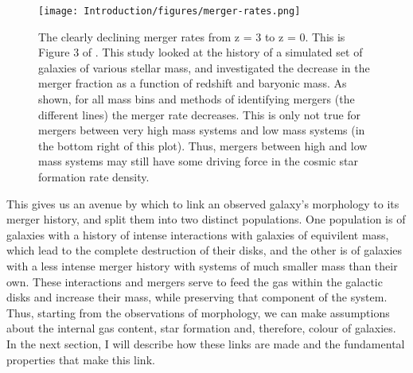 \begin{figure}
    \centering
    \texttt{[image: Introduction/figures/merger-rates.png]}
    \caption{The clearly declining merger rates from z = 3 to z = 0. This is Figure 3 of \citet{2010ApJ...715..202H}. This study looked at the history of a simulated set of galaxies of various stellar mass, and investigated the decrease in the merger fraction as a function of redshift and baryonic mass. As shown, for all mass bins and methods of identifying mergers (the different lines) the merger rate decreases. This is only not true for mergers between very high mass systems and low mass systems (in the bottom right of this plot). Thus, mergers between high and low mass systems may still have some driving force in the cosmic star formation rate density.}
    \label{fig:merger-rate}
\end{figure}

This gives us an avenue by which to link an observed galaxy's morphology to its merger history, and split them into two distinct populations. One population is of galaxies with a history of intense interactions with galaxies of equivilent mass, which lead to the complete destruction of their disks, and the other is of galaxies with a less intense merger history with systems of much smaller mass than their own. These interactions and mergers serve to feed the gas within the galactic disks and increase their mass, while preserving that component of the system. Thus, starting from the observations of morphology, we can make assumptions about the internal gas content, star formation and, therefore, colour of galaxies. In the next section, I will describe how these links are made and the fundamental properties that make this link.

